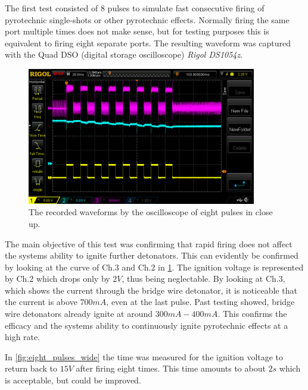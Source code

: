 \noindent The first test consisted of 8 pulses to simulate fast consecutive firing of pyrotechnic single-shots or other pyrotechnic effects. Normally firing the same port multiple times does not make sense, but for testing purposes this is equivalent to firing eight separate ports. The resulting waveform was captured with the Quad DSO (digital storage oscilloscope) \textit{Rigol DS1054z}.\\

\begin{figure}[!ht]
    \centering
    \includegraphics[width=10cm]{./Figures/eight_pulses_close.png}
    \caption{The recorded waveforms by the oscilloscope of eight pulses in close up.}
    \label{fig:eight_pulses_close}     
\end{figure}
 
\noindent The main objective of this test was confirming that rapid firing does not affect the systems ability to ignite further detonators. This can evidently be confirmed by looking at the curve of Ch.3 and Ch.2 in \cref{fig:eight_pulses_close}. The ignition voltage is represented by Ch.2 which drops only by $2V$, thus being neglectable. By looking at Ch.3, which shows the current through the bridge wire detonator, it is noticeable that the current is above $700mA$, even at the last pulse. Past testing showed, bridge wire detonators already ignite at around $300mA-400mA$. This confirms the efficacy and the systems ability to continuously ignite pyrotechnic effects at a high rate.

\pagebreak

\noindent In \cref{fig:eight_pulses_wide} the time was measured for the ignition voltage to return back to $15V$ after firing eight times. This time amounts to about $2s$ which is acceptable, but could be improved.\\ 

